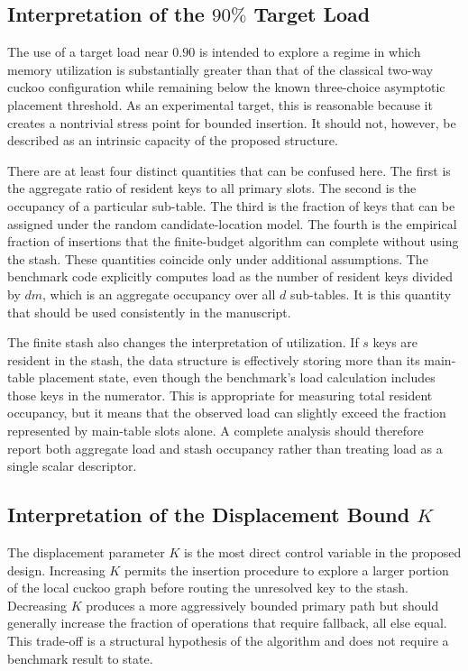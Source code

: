 \documentclass[conference]{IEEEtran}
\begin{document}
\subsection{Interpretation of the $90\%$ Target Load}
\label{subsec:discussion_90load}

The use of a target load near $0.90$ is intended to explore a regime in which
memory utilization is substantially greater than that of the classical two-way
cuckoo configuration while remaining below the known three-choice asymptotic
placement threshold. As an experimental target, this is reasonable because it
creates a nontrivial stress point for bounded insertion. It should not,
however, be described as an intrinsic capacity of the proposed structure.

There are at least four distinct quantities that can be confused here. The
first is the aggregate ratio of resident keys to all primary slots. The second
is the occupancy of a particular sub-table. The third is the fraction of keys
that can be assigned under the random candidate-location model. The fourth is
the empirical fraction of insertions that the finite-budget algorithm can
complete without using the stash. These quantities coincide only under
additional assumptions. The benchmark code explicitly computes load as the
number of resident keys divided by $dm$, which is an aggregate occupancy over
all $d$ sub-tables. It is this quantity that should be used consistently in
the manuscript.

The finite stash also changes the interpretation of utilization. If $s$ keys
are resident in the stash, the data structure is effectively storing more than
its main-table placement state, even though the benchmark's load calculation
includes those keys in the numerator. This is appropriate for measuring total
resident occupancy, but it means that the observed load can slightly exceed
the fraction represented by main-table slots alone. A complete analysis should
therefore report both aggregate load and stash occupancy rather than treating
load as a single scalar descriptor.

\subsection{Interpretation of the Displacement Bound $K$}
\label{subsec:discussion_k}

The displacement parameter $K$ is the most direct control variable in the
proposed design. Increasing $K$ permits the insertion procedure to explore a
larger portion of the local cuckoo graph before routing the unresolved key to
the stash. Decreasing $K$ produces a more aggressively bounded primary path
but should generally increase the fraction of operations that require
fallback, all else equal. This trade-off is a structural hypothesis of the
algorithm and does not require a benchmark result to state.
\end{document}
